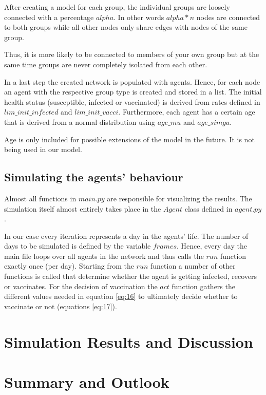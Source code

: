 \documentclass[11pt]{article}
\begin{document}
After creating a model for each group, the individual groups are loosely connected with a percentage $alpha$. In other words $alpha * n$ nodes are connected to both groups while all other nodes only share edges with nodes of the same group.

Thus, it is more likely to be connected to members of your own group but at the same time groups are never completely isolated from each other. 

In a last step the created network is populated with agents. Hence, for each node an agent with the respective group type is created and stored in a list. The initial health status (susceptible, infected or vaccinated) is derived from rates defined in $lim\_init\_infected$ and $lim\_init\_vacci$. Furthermore, each agent has a certain age that is derived from a normal distribution using $age\_mu$ and $age\_simga$.

Age is only included for possible extensions of the model in the future. It is not being used in our model.


\subsection{Simulating the agents' behaviour}
Almost all functions in $main.py$ are responsible for visualizing the results.
The simulation itself almost entirely takes place in the $Agent$ class defined in $agent.py$.


In our case every iteration represents a day in the agents' life. The number of days to be simulated is defined by the variable $frames$.
Hence, every day the main file loops over all agents in the network and thus calls the $run$ function exactly once (per day). Starting from the $run$ function a number of other functions is called that determine whether the agent is getting infected, recovers or vaccinates. For the decision of vaccination the $act$ function gathers the different values needed in equation \eqref{eq:16} to ultimately decide whether to vaccinate or not (equations \eqref{eq:17}).


\section{Simulation Results and Discussion}



\section{Summary and Outlook}








\clearpage
\end{document}
